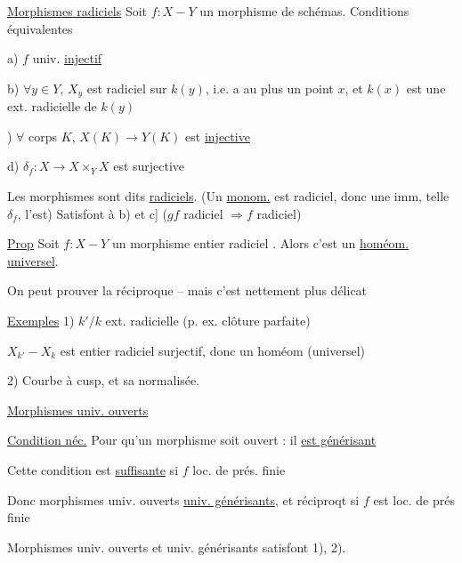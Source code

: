 \uline{Morphismes radiciels} \quad Soit $f:X\mathrel{-}Y$ un morphisme de schémas. Conditions équivalentes

a) $f$ univ. \uline{injectif}

b) $\forall y\in Y$, $X_y$ est radiciel sur $k(y)$, i.e.  a au plus un point $x$, et $k(x)$ est une ext. radicielle de $k(y)$

) $\forall$ corps $K$, $X(K)\longrightarrow Y(K)$ est \uline{injective}

d) $\delta_f:X\longrightarrow X\times_Y X$ est surjective

Les morphismes sont dits \uline{radiciels}. (Un \uline{monom.} est radiciel, donc une imm, telle $\delta_f$, l'est) Satisfont à b) et c] ($gf$ radiciel $\Rightarrow f$ radiciel)

\uline{Prop} Soit $f:X\mathrel{-}Y$ un morphisme entier radiciel . Alors c'est un \uline{homéom.}  \uline{universel}.

On peut prouver la réciproque -- mais c'est nettement plus délicat

\uline{Exemples} 1) $k'/k$ ext. radicielle (p. ex. clôture parfaite)

$X_{k'}\mathrel{-}X_k$ est entier radiciel surjectif, donc un homéom (universel)

2) Courbe à cusp, et sa normalisée.

\uline{Morphismes univ. ouverts}

\uline{Condition néc.} Pour qu'un morphisme soit ouvert : il \uline{est générisant}

Cette condition est \uline{suffisante} si $f$ loc. de prés. finie

Donc morphismes univ. ouverts  \uline{univ. générisants}, et réciproqt si $f$ est loc. de prés finie

Morphismes univ. ouverts et univ. générisants satisfont 1), 2).

